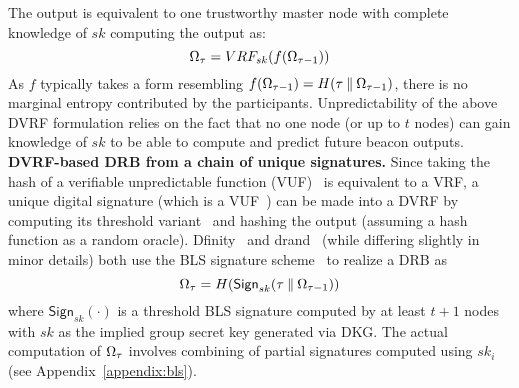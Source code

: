 The output is equivalent to one trustworthy master node with complete knowledge of $sk$ computing the output as:
\[
\Omega_\tau = VRF_{sk}(f(\Omega_{\tau - 1}))
\]
As $f$ typically takes a form resembling $f(\Omega_{\tau - 1}) = H(\tau \mathbin\Vert \Omega_{\tau - 1})$, there is no marginal entropy contributed by the participants. Unpredictability of the above DVRF formulation relies on the fact that no one node (or up to $t$ nodes) can gain knowledge of $sk$ to be able to compute and predict future beacon outputs.\\

\noindent\textbf{DVRF-based DRB from a chain of unique signatures.} Since taking the hash of a verifiable unpredictable function (VUF)~\cite{micali1999verifiable} is equivalent to a VRF, a unique digital signature (which is a VUF~\cite{dodis2005verifiable}) can be made into a DVRF by computing its threshold variant~\cite{boldyreva2003threshold} and hashing the output (assuming a hash function as a random oracle). Dfinity~\cite{camenisch2022internet} and drand~\cite{drand} (while differing slightly in minor details) both use the BLS signature scheme~\cite{boneh2001short} to realize a DRB as
\[
\Omega_\tau = H(\mathsf{Sign}_{sk}(\tau \mathbin\Vert \Omega_{\tau - 1}))
\]
where $\mathsf{Sign}_{sk}(\cdot)$ is a threshold BLS signature computed by at least $t + 1$ nodes with $sk$ as the implied group secret key generated via DKG. The actual computation of $\Omega_\tau$ involves combining of partial signatures computed using $sk_i$ (see Appendix~\ref{appendix:bls}).\\

